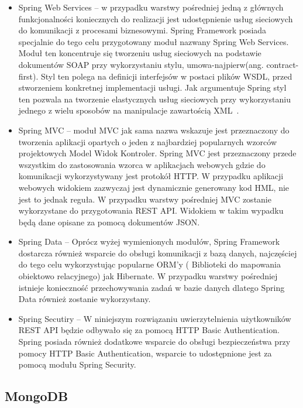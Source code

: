 \begin{itemize}

\item Spring Web Services  -- w przypadku warstwy pośredniej jedną z głównych funkcjonalności koniecznych do realizacji jest udostępnienie usług sieciowych do komunikacji z procesami biznesowymi. Spring Framework posiada specjalnie do tego celu przygotowany moduł nazwany Spring Web Services. Moduł ten koncentruje się tworzeniu usług sieciowych na podstawie dokumentów SOAP przy wykorzystaniu stylu, umowa-najpierw(ang. contract-first). Styl ten polega na definicji interfejsów w postaci plików WSDL, przed stworzeniem konkretnej implementacji usługi. Jak argumentuje Spring styl ten pozwala na tworzenie elastycznych usług sieciowych przy wykorzystaniu jednego z wielu sposobów na manipulacje zawartością XML~\cite{springWS}.

\item Spring MVC -- moduł MVC jak sama nazwa wskazuje jest przeznaczony do tworzenia aplikacji opartych o jeden z najbardziej popularnych wzorców projektowych Model Widok Kontroler. Spring MVC jest przeznaczony przede wszystkim do zastosowania wzorca w aplikacjach webowych gdzie do komunikacji wykorzystywany jest protokół HTTP. W przypadku aplikacji webowych widokiem zazwyczaj jest dynamicznie generowany kod HML, nie jest to jednak reguła. W przypadku warstwy pośredniej MVC zostanie wykorzystane do przygotowania REST API. Widokiem w takim wypadku będą dane opisane za pomocą dokumentów JSON. 

\item Spring Data -- Oprócz wyżej wymienionych modułów, Spring Framework dostarcza również wsparcie do obsługi komunikacji z bazą danych, najczęściej do tego celu wykorzystując popularne ORM'y ( Biblioteki do mapowania obiektowo relacyjnego) jak Hibernate. W przypadku warstwy pośredniej istnieje konieczność przechowywania zadań w bazie danych dlatego Spring Data również zostanie wykorzystany.

\item Spring Secutiry -- W niniejszym rozwiązaniu uwierzytelnienia użytkowników REST API będzie odbywało się za pomocą HTTP Basic Authentication. Spring posiada również dodatkowe wsparcie do obsługi bezpieczeństwa przy pomocy HTTP Basic Authentication, wsparcie to udostępnione jest za pomocą modułu Spring Security.   

\end{itemize}

\subsection{MongoDB}

